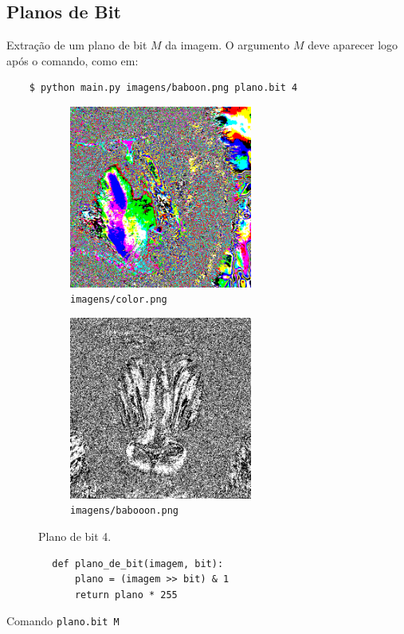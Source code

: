 \subsection{Planos de Bit}

Extração de um plano de bit $M$ da imagem. O argumento $M$ deve aparecer logo após o comando, como em:

\begin{verbatim}
    $ python main.py imagens/baboon.png plano.bit 4
\end{verbatim}

\begin{figure}[H]
    \centering
    \begin{subfigure}{0.45\textwidth}
        \centering
        \includegraphics[width=6cm]{resultados/colorbit.png}
        \caption{\texttt{imagens/color.png}}
    \end{subfigure}%
    \begin{subfigure}{0.45\textwidth}
        \centering
        \includegraphics[width=6cm]{resultados/baboonbit.png}
        \caption{\texttt{imagens/babooon.png}}
    \end{subfigure}

    \caption{Plano de bit 4.}
\end{figure}

\begin{listing}[H]
    \begin{verbatim}
        def plano_de_bit(imagem, bit):
            plano = (imagem >> bit) & 1
            return plano * 255
    \end{verbatim}

    \caption{Comando \texttt{plano.bit M}}
\end{listing}
